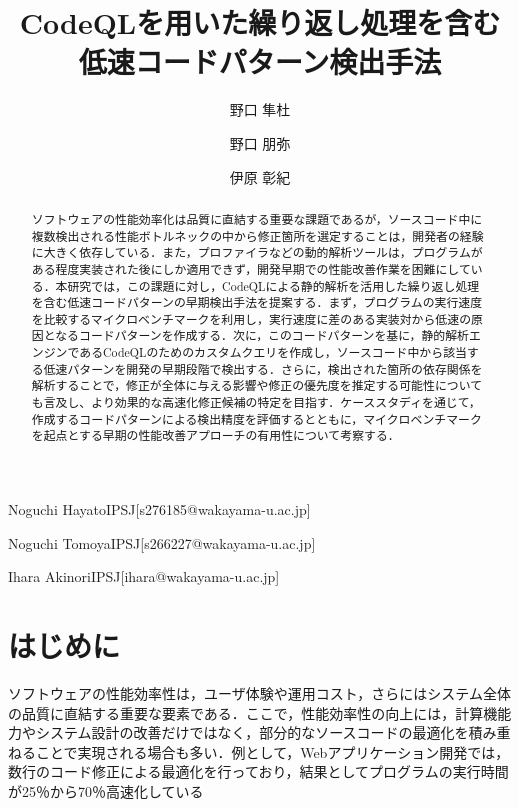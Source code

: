 \documentclass[submit,techrep,noauthor]{ipsj}
\begin{document}
\title{CodeQLを用いた繰り返し処理を含む
\\
低速コードパターン検出手法
}


\author{野口 隼杜}{Noguchi Hayato}{IPSJ}[s276185@wakayama-u.ac.jp]
\author{野口 朋弥}{Noguchi Tomoya}{IPSJ}[s266227@wakayama-u.ac.jp]
\author{伊原 彰紀}{Ihara Akinori}{IPSJ}[ihara@wakayama-u.ac.jp]

\begin{abstract}
ソフトウェアの性能効率化は品質に直結する重要な課題であるが，ソースコード中に複数検出される性能ボトルネックの中から修正箇所を選定することは，開発者の経験に大きく依存している．また，プロファイラなどの動的解析ツールは，プログラムがある程度実装された後にしか適用できず，開発早期での性能改善作業を困難にしている．本研究では，この課題に対し，CodeQLによる静的解析を活用した繰り返し処理を含む低速コードパターンの早期検出手法を提案する．まず，プログラムの実行速度を比較するマイクロベンチマークを利用し，実行速度に差のある実装対から低速の原因となるコードパターンを作成する．次に，このコードパターンを基に，静的解析エンジンであるCodeQLのためのカスタムクエリを作成し，ソースコード中から該当する低速パターンを開発の早期段階で検出する．さらに，検出された箇所の依存関係を解析することで，修正が全体に与える影響や修正の優先度を推定する可能性についても言及し、より効果的な高速化修正候補の特定を目指す．ケーススタディを通じて，作成するコードパターンによる検出精度を評価するとともに，マイクロベンチマークを起点とする早期の性能改善アプローチの有用性について考察する．
\end{abstract}


\maketitle

\section{はじめに}

 ソフトウェアの性能効率性は，ユーザ体験や運用コスト，さらにはシステム全体の品質に直結する重要な要素である．ここで，性能効率性の向上には，計算機能力やシステム設計の改善だけではなく，部分的なソースコードの最適化を積み重ねることで実現される場合も多い．例として，Webアプリケーション開発では，数行のコード修正による最適化を行っており，結果としてプログラムの実行時間が25％から70％高速化している\cite{jsRefac}
\end{document}
